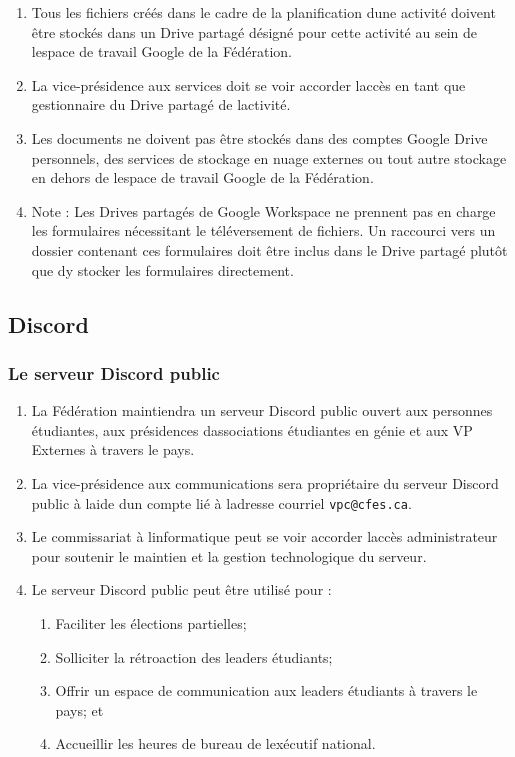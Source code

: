\begin{enumerate}
 \item
  Tous les fichiers créés dans le cadre de la planification d\textquotesingle une activité doivent être stockés dans un Drive partagé désigné pour cette activité au sein de l\textquotesingle espace de travail Google de la Fédération.
 \item
  La vice-présidence aux services doit se voir accorder l\textquotesingle accès en tant que gestionnaire du Drive partagé de l\textquotesingle activité.
 \item
  Les documents ne doivent pas être stockés dans des comptes Google Drive personnels, des services de stockage en nuage externes ou tout autre stockage en dehors de l\textquotesingle espace de travail Google de la Fédération.
 \item
  Note : Les Drives partagés de Google Workspace ne prennent pas en charge les formulaires nécessitant le téléversement de fichiers. Un raccourci vers un dossier contenant ces formulaires doit être inclus dans le Drive partagé plutôt que d\textquotesingle y stocker les formulaires directement.
\end{enumerate}

\subsection{Discord}
\label{discord}

\subsubsection{Le serveur Discord public}
\label{le-serveur-discord-public}

\begin{enumerate}
 \item
  La Fédération maintiendra un serveur Discord public ouvert aux personnes étudiantes, aux présidences d\textquotesingle associations étudiantes en génie et aux VP Externes à travers le pays.
 \item
  La vice-présidence aux communications sera propriétaire du serveur Discord public à l\textquotesingle aide d\textquotesingle un compte lié à l\textquotesingle adresse courriel \texttt{vpc@cfes.ca}.
 \item
  Le commissariat à l\textquotesingle informatique peut se voir accorder l\textquotesingle accès administrateur pour soutenir le maintien et la gestion technologique du serveur.
 \item
  Le serveur Discord public peut être utilisé pour :

  \begin{enumerate}
   \item
    Faciliter les élections partielles;
   \item
    Solliciter la rétroaction des leaders étudiants;
   \item
    Offrir un espace de communication aux leaders étudiants à travers le pays; et
   \item
    Accueillir les heures de bureau de l\textquotesingle exécutif national.
  \end{enumerate}

\end{enumerate}

